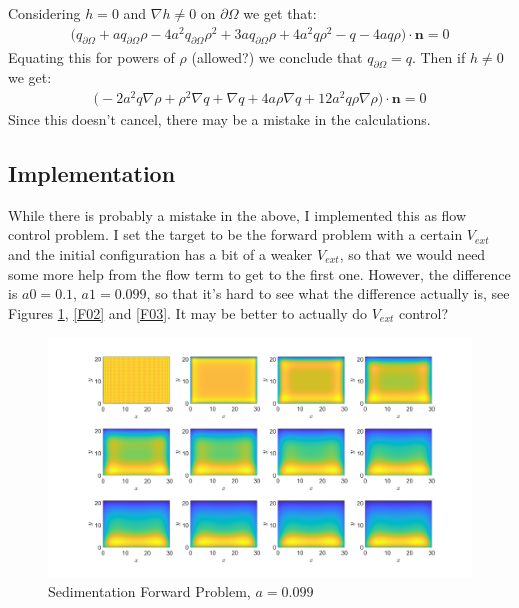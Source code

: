 \documentclass[11pt, a4paper]{article}
\theoremstyle{definition}
\newcommand{\n}{\mathbf{n}}
\begin{document}
Considering $h =0$ and $\nabla h \neq 0$ on $\partial \Omega$ we get that:
\begin{align*}
\bigg(  q_{\partial \Omega} + aq_{\partial \Omega}\rho - 4a^2q_{\partial \Omega} \rho^2 + 3a q_{\partial \Omega}\rho + 4a^2 q \rho^2 -q - 4aq\rho \bigg) \cdot \n = 0
\end{align*}
Equating this for powers of $\rho$ (allowed?) we conclude that $q_{\partial \Omega} = q$. Then if $h \neq 0$ we get:
\begin{align*}
\bigg( -2a^2q \nabla \rho             
+\rho^2 \nabla q + \nabla q +4a\rho\nabla q   + 12a^2 q \rho \nabla \rho\bigg) \cdot \n =0
\end{align*}
Since this doesn't cancel, there may be a mistake in the calculations.

\subsection{Implementation}
While there is probably a mistake in the above, I implemented this as flow control problem. I set the target to be the forward problem with a certain $V_{ext}$ and the initial configuration has a bit of a weaker $V_{ext}$, so that we would need some more help from the flow term to get to the first one. However, the difference is $a0 = 0.1$, $a1 =0.099$, so that it's hard to see what the difference actually is, see Figures \ref{F01}, \ref{F02} and \ref{F03}. It may be better to actually do $V_{ext}$ control?
\begin{figure}[h]
	\centering
	\includegraphics[scale=0.2]{FW1.png}
	\caption{Sedimentation Forward Problem, $a = 0.099$} 
	\label{F01}
\end{figure} 
\end{document}
